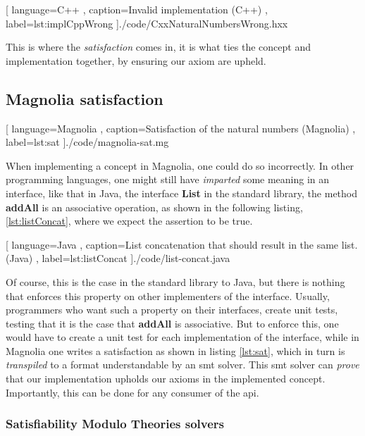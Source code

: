 \begin{code}[H]
  
    [ language=C++
    , caption={Invalid implementation (C++)}
    , label=lst:implCppWrong
    ]{./code/CxxNaturalNumbersWrong.hxx}
\end{code}

This is where the
\textit{satisfaction} comes in, it is what ties the concept and implementation
together, by ensuring our axiom are upheld.

\subsection{Magnolia satisfaction}

\begin{center}
  
    [ language=Magnolia
    , caption={Satisfaction of the natural numbers (Magnolia)}
    , label=lst:sat
    ]{./code/magnolia-sat.mg}
\end{center}

When implementing a concept in Magnolia, one could do so incorrectly. In other
programming languages, one might still have \textit{imparted} some meaning in an
interface, like that in Java, the interface \textbf{List} in the standard
library, the method \textbf{addAll} is an associative operation, as shown in
the following listing, \ref{lst:listConcat}, where we expect the assertion to be
true.

\begin{code}
  
    [ language=Java
    , caption={List concatenation that should result in the same list. (Java)}
    , label=lst:listConcat
    ]{./code/list-concat.java}
\end{code}

Of course, this is the case in the standard library to Java, but there is
nothing that enforces this property on other implementers of the interface.
Usually, programmers who want such a property on their interfaces, create unit
tests, testing that it is the case that \textbf{addAll} is associative. But to
enforce this, one would have to create a unit test for each implementation of
the interface, while in Magnolia one writes a satisfaction as shown in listing
\ref{lst:sat}, which in turn is \textit{transpiled} to a format understandable
by an \gls*{smt} solver. This \gls*{smt} solver can \textit{prove} that our
implementation upholds our axioms in the implemented concept. Importantly, this
can be done for any consumer of the \gls*{api}.


\subsubsection{Satisfiability Modulo Theories solvers}


